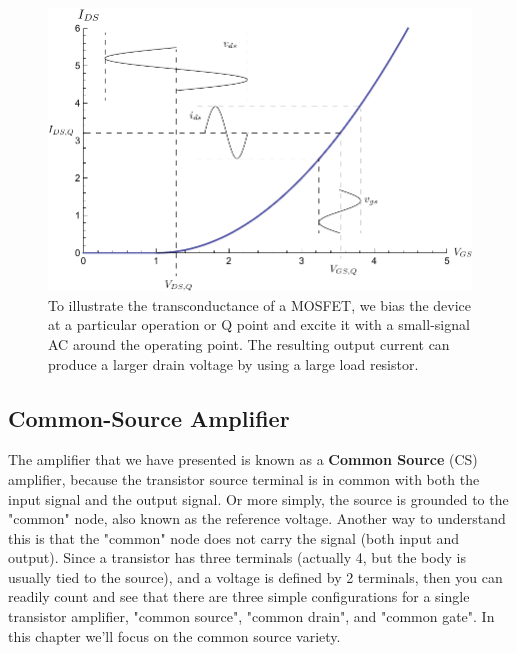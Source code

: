\begin{figure}[tb]
\centering
\includegraphics[width=.75\columnwidth]{ids_vgs_vds}
\caption{To illustrate the transconductance of a MOSFET, we bias the device at a particular operation or Q point and excite it with a small-signal AC around the operating point.  The resulting output current can produce a larger drain voltage by using a large load resistor.}
\label{fig:ids_vgs_vds}
\end{figure}
\subsection{Common-Source Amplifier}
The amplifier that we have presented is known as a \textbf{Common Source} (CS) amplifier, because the transistor source terminal is in common with both the input signal and the output signal.  Or more simply, the source is grounded to the "common" node, also known as the reference voltage.  Another way to understand this is that the "common" node does not carry the signal (both input and output).  Since a transistor has three terminals (actually 4, but the body is usually tied to the source), and a voltage is defined by 2 terminals, then you can readily count and see that there are three simple configurations for a single transistor amplifier, "common source", "common drain", and "common gate".  In this chapter we'll focus on the common source variety.
